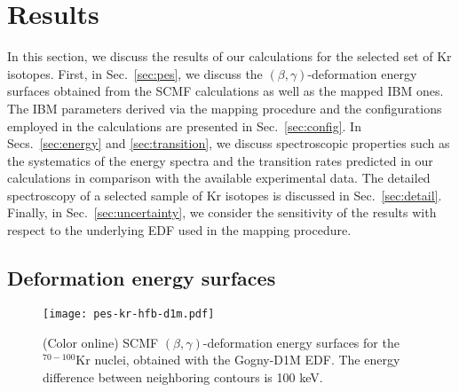 \documentclass[twocolumn,showpacs,amsmath,amssymb,superscriptaddress]{revtex4-1}
\begin{document}

\section{Results\label{sec:results}}



In this section, we discuss the results of our calculations 
for the selected set of Kr isotopes. 
First, in Sec.~\ref{sec:pes}, we discuss 
the $(\beta,\gamma)$-deformation energy surfaces obtained from the SCMF
calculations as well as the mapped IBM ones. 
The IBM parameters derived via the mapping procedure 
and the configurations employed in the calculations are 
presented in Sec.~\ref{sec:config}. 
In Secs.~\ref{sec:energy}
and \ref{sec:transition}, we discuss spectroscopic properties such as
the systematics of the energy spectra and the transition rates predicted
in our calculations in comparison with the available
experimental data. The detailed spectroscopy of a selected sample of Kr
isotopes is discussed in Sec.~\ref{sec:detail}.
Finally, in Sec.~\ref{sec:uncertainty}, we consider the sensitivity 
of the results with respect to the underlying EDF used in the mapping procedure.





\subsection{Deformation energy surfaces\label{sec:pes}}






\begin{figure*}[htb!]
\begin{center}
\texttt{[image: pes-kr-hfb-d1m.pdf]}
\caption{(Color online) SCMF $(\beta,\gamma)$-deformation energy
 surfaces for the $^{70-100}$Kr nuclei, obtained with the Gogny-D1M EDF. The energy difference 
between neighboring contours is 100 keV. }
\label{fig:pes-hfb}
\end{center}
\end{figure*}
\end{document}
